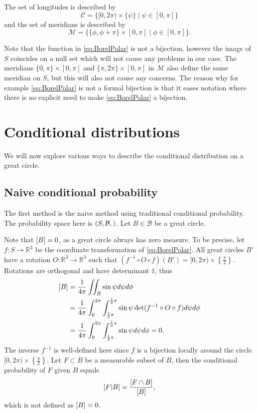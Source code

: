\documentclass[twoside,a4paper]{report}
\theoremstyle{plain}
\theoremstyle{definition}
\theoremstyle{remark}
\numberwithin{equation}{chapter}
\newcommand{\R}{\mathbb{R}}
\let\P\relax
\DeclareMathOperator{\P}{\mathbb{P}}
\DeclareMathOperator{\1}{\mathbbm{1}}
\newcommand{\B}{\mathcal{B}}
\begin{document}
The set of longitudes is described by 
\begin{equation}
\mathcal{C}=\{[0,2\pi)\times\{\psi\}\mid\psi\in[0,\pi]\}
\end{equation}
and the set of meridians is described by
\begin{equation}
\mathcal{M}=\{\{\phi,\phi+\pi\}\times[0,\pi]\mid\phi\in[0,\pi]\}.
\end{equation}

Note that the function in \eqref{eq:BorelPolar} is not a bijection, however the image of $S$ coincides on a null set which will not cause any problems in our case. The meridians $\{0,\pi\}\times[0,\pi]$ and $\{\pi,2\pi\}\times[0,\pi]$ in $\mathcal{M}$ also define the same meridian on $S$, but this will also not cause any concerns. The reason why for example \eqref{eq:BorelPolar} is not a formal bijection is that it eases notation where there is no explicit need to make \eqref{eq:BorelPolar} a bijection.

\section{Conditional distributions}
We will now explore various ways to describe the conditional distribution on a great circle.
\subsection{Naive conditional probability}\label{sec:BorelNaive}
The first method is the naive method using traditional conditional probability. The probability space here is $(S,\B,\P)$. Let $B\in\B$ be a great circle.

Note that $\P[B]=0$, as a great circle always has zero measure. To be precise, let $f\colon S\to\R^3$ be the coordinate transformation of \eqref{eq:BorelPolar}. All great circles $B'$ have a rotation $O\colon\R^3\to\R^3$ such that $(f^{-1}\circ O\circ f)(B')=[0,2\pi)\times\left\{\frac{\pi}{2}\right\}$. Rotations are orthogonal and have determinant $1$, thus
\begin{align}
\P[B]&=\frac{1}{4\pi}\iint_B\sin\psi d\psi d\phi\\
&=\frac{1}{4\pi}\int_0^{2\pi}\int_{\frac{1}{2}\pi}^{\frac{1}{2}\pi}\sin\psi \det(f^{-1}\circ O\circ f)d\psi d\phi\\
&=\frac{1}{4\pi}\int_0^{2\pi}\int_{\frac{1}{2}\pi}^{\frac{1}{2}\pi}\sin\psi d\psi d\phi=0.
\end{align}
The inverse $f^{-1}$ is well-defined here since $f$ is a bijection locally around the circle $[0,2\pi)\times\left\{\frac{\pi}{2}\right\}$. Let $F\subset B$ be a measurable subset of $B$, then the conditional probability of $F$ given $B$ equals
\begin{equation}
\P[F|B]=\frac{\P[F\cap B]}{\P[B]},
\end{equation}
which is not defined as $\P[B]=0$.
\end{document}
